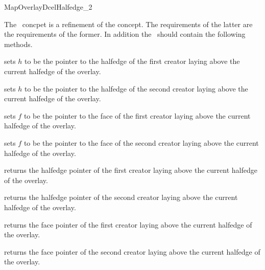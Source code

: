 
\ccRefPageBegin


\begin{ccRefConcept}{MapOverlayDcelHalfedge_2}


The \ccRefName\ concpet is a refinement of the  concept. 
The requirements of the latter are the requirements of the former.
In addition the \ccRefName\ should contain the following methods.

  \ccOperations
  {sets $h$ to be the pointer to the halfedge of the first creator laying above the current halfedge of the overlay.}

  {sets $h$ to be the pointer to the halfedge of the second creator laying above the current halfedge of the overlay.}

  {sets $f$ to be the pointer to the face of the first creator laying above the current halfedge of the overlay.}
  
  {sets $f$ to be the pointer to the face of the second creator laying above the current halfedge of the overlay.}
   
  {returns the halfedge pointer of the first creator laying above the current halfedge of the overlay.}

  {returns the halfedge pointer of the second creator laying above the current halfedge of the overlay.}

  {returns the face pointer of the first creator laying above the current halfedge of the overlay.}

  {returns the face pointer of the second creator laying above the current halfedge of the overlay.}
  
\end{ccRefConcept} %

\ccRefPageEnd
